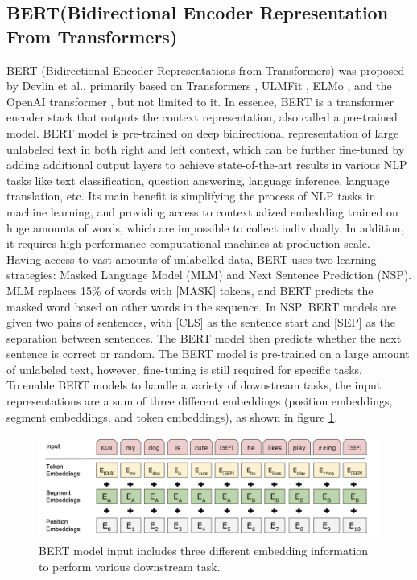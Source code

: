 \documentclass[%
	BCOR=8mm, %
	DIV=12,
	toc=bibliography, %
	toc=listof, %
	oneside, %
	egregdoesnotlikesansseriftitles, %
	]{scrbook}
\begin{document}
\subsection{BERT(Bidirectional Encoder Representation From Transformers)}
BERT (Bidirectional Encoder Representations from Transformers) was proposed by Devlin et al.\cite{devlin_bert_2019-1}, primarily based on Transformers \cite{vaswani_attention_2017}, ULMFit \cite{howard_universal_2018}, ELMo \cite{peters_deep_2018-3}, and the OpenAI transformer \cite{radford_improving_nodate}, but not limited to it. In essence, BERT is a transformer encoder stack that outputs the context representation, also called a pre-trained model. BERT model is pre-trained on deep bidirectional representation of large unlabeled text in both right and left context, which can be further fine-tuned by adding additional output layers to achieve state-of-the-art results in various NLP tasks like text classification, question answering, language inference, language translation, etc. Its main benefit is simplifying the process of NLP tasks in machine learning, and providing access to contextualized embedding trained on huge amounts of words, which are impossible to collect individually. In addition, it requires high performance computational machines at production scale. \\
Having access to vast amounts of unlabelled data,  BERT uses two learning strategies: Masked Language Model (MLM) and Next Sentence Prediction (NSP). MLM replaces 15\% of words with [MASK] tokens, and BERT predicts the masked word based on other words in the sequence.
In NSP, BERT models are given two pairs of sentences, with [CLS] as the sentence start and [SEP] as the separation between sentences. The BERT model then predicts whether the next sentence is correct or random. The BERT model is pre-trained on a large amount of unlabeled text, however, fine-tuning is still required for specific tasks.\\
To enable BERT models to handle a variety of downstream tasks, the input representations are a sum of three different embeddings (position embeddings, segment embeddings, and token embeddings), as shown in figure \ref{fig:bert_inp}.
\begin{figure}[H]
    \centering
    \includegraphics[width=0.7\linewidth]{img/bert_inp.png}
    \caption[Three different embeddings in BERT model]{\small BERT model input includes three different embedding information to perform various downstream task\cite{devlin_bert_2019-1}. }
    \label{fig:bert_inp}
\end{figure}
\end{document}

